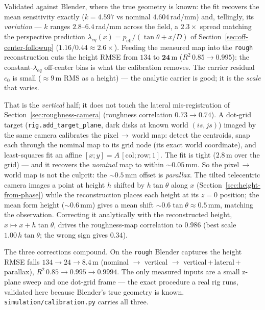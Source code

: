 \documentclass[11pt]{article}
\begin{document}
Validated against Blender, where the true geometry is known: the fit recovers the
mean sensitivity exactly ($k=4.597$ vs nominal $4.604$\,rad/mm) and, tellingly,
its \emph{variation} --- $k$ ranges $2.8$--$6.4$\,rad/mm across the field, a
$2.3\times$ spread matching the perspective prediction $\lambda_{eq}(x)=
p_{\text{eff}}/(\tan\theta+x/D)$ of Section~\ref{sec:off-center-followup}
($1.16/0.44\approx2.6\times$). Feeding the measured map into the \texttt{rough}
reconstruction cuts the height RMSE from $134$ to $\mathbf{24}$\,\textmu m
($R^2\,0.85\to0.995$): the constant-$\lambda_{eq}$ off-center bias is what the
calibration removes. The carrier residual $c_0$ is small ($\approx9$\,\textmu m
RMS as a height) --- the analytic carrier is good; it is the \emph{scale} that
varies.

That is the \emph{vertical} half; it does not touch the lateral
mis-registration of Section~\ref{sec:roughness-camera} (roughness correlation
$0.73\to0.74$). A dot-grid target (\texttt{rig.add\_target\_plane}, dark disks at
known world $(is,js)$) imaged by the same camera calibrates the
pixel$\,\to\,$world map: detect the centroids, snap each through the nominal map
to its grid node (its exact world coordinate), and least-squares fit an affine
$[x;y]=A\,[\text{col};\text{row};1]$. The fit is tight ($2.8$\,\textmu m over the
grid) --- and it recovers the \emph{nominal} map to within $\sim\!0.05$\,mm. So
the pixel$\,\to\,$world map is not the culprit: the $\sim\!0.5$\,mm offset is
\emph{parallax}. The tilted telecentric camera images a point at height $h$
shifted by $h\tan\theta$ along $x$ (Section~\ref{sec:height-from-phase}) while the
reconstruction places each height at its $z=0$ position; the mean form height
($\sim\!0.6$\,mm) gives a mean shift $\sim\!0.6\tan\theta\approx0.5$\,mm, matching
the observation. Correcting it analytically with the reconstructed height, $x
\mapsto x + h\tan\theta$, drives the roughness-map correlation to $0.986$ (best
scale $1.00\,h\tan\theta$; the wrong sign gives $0.34$).

The three corrections compound. On the \texttt{rough} Blender captures the height
RMSE falls $134 \to 24 \to \mathbf{8.4}$\,\textmu m (nominal $\to$ vertical $\to$
vertical\,+\,lateral\,+\,parallax), $R^2\,0.85\to0.995\to0.9994$. The only
measured inputs are a small z-plane sweep and one dot-grid frame --- the exact
procedure a real rig runs, validated here because Blender's true geometry is
known. \texttt{simulation/calibration.py} carries all three.
\end{document}
